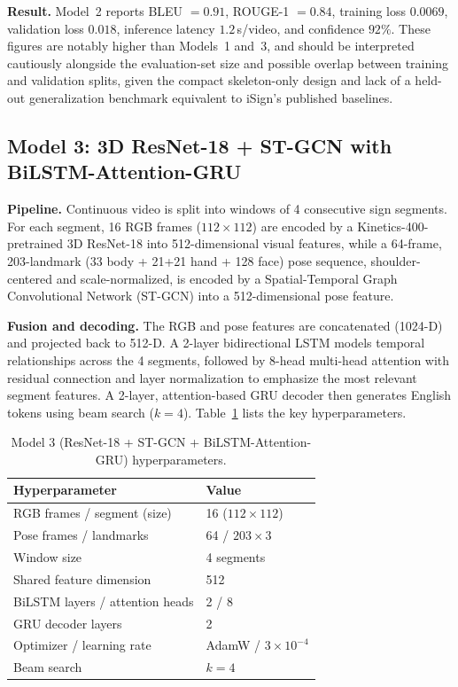 \documentclass[pdflatex,sn-mathphys-num]{sn-jnl}
\begin{document}
\textbf{Result.} Model~2 reports BLEU $= 0.91$, ROUGE-1 $= 0.84$, training loss $0.0069$, validation loss $0.018$, inference latency $1.2$\,s/video, and confidence $92\%$. These figures are notably higher than Models~1 and~3, and should be interpreted cautiously alongside the evaluation-set size and possible overlap between training and validation splits, given the compact skeleton-only design and lack of a held-out generalization benchmark equivalent to iSign's published baselines.

\subsection{Model 3: 3D ResNet-18 + ST-GCN with BiLSTM-Attention-GRU}\label{sec:model3}
\textbf{Pipeline.} Continuous video is split into windows of 4 consecutive sign segments. For each segment, 16 RGB frames ($112{\times}112$) are encoded by a Kinetics-400-pretrained 3D ResNet-18 into 512-dimensional visual features, while a 64-frame, 203-landmark (33 body + 21+21 hand + 128 face) pose sequence, shoulder-centered and scale-normalized, is encoded by a Spatial-Temporal Graph Convolutional Network (ST-GCN) into a 512-dimensional pose feature.

\textbf{Fusion and decoding.} The RGB and pose features are concatenated (1024-D) and projected back to 512-D. A 2-layer bidirectional LSTM models temporal relationships across the 4 segments, followed by 8-head multi-head attention with residual connection and layer normalization to emphasize the most relevant segment features. A 2-layer, attention-based GRU decoder then generates English tokens using beam search ($k{=}4$). Table~\ref{tab:model3-hp} lists the key hyperparameters.

\begin{table}[h]
\centering
\caption{Model 3 (ResNet-18 + ST-GCN + BiLSTM-Attention-GRU) hyperparameters.}\label{tab:model3-hp}
\begin{tabular}{@{}ll@{}}
\toprule
Hyperparameter & Value \\
\midrule
RGB frames / segment (size) & 16 ($112\times112$) \\
Pose frames / landmarks & 64 / $203\times3$ \\
Window size & 4 segments \\
Shared feature dimension & 512 \\
BiLSTM layers / attention heads & 2 / 8 \\
GRU decoder layers & 2 \\
Optimizer / learning rate & AdamW / $3\times10^{-4}$ \\
Beam search & $k=4$ \\
\bottomrule
\end{tabular}
\end{table}
\end{document}
